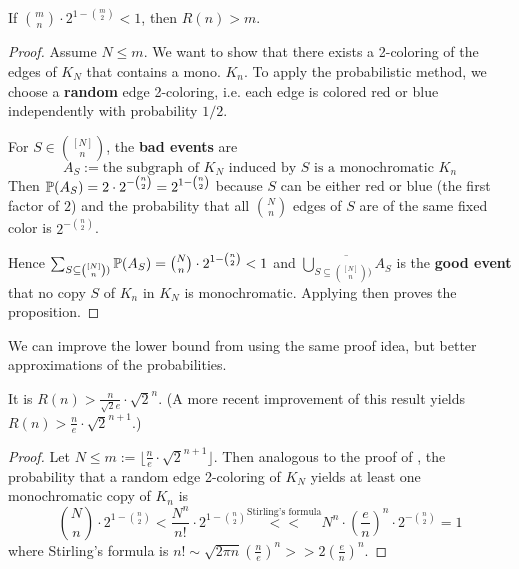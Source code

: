 \documentclass[../main.tex]{subfiles}
\begin{document}
\begin{proposition}[Erd\"os 1947]\label{prop:ramseyLowerProb}
	If $\binom{m}{n} \cdot 2^{1-\binom{m}{2}} < 1$, then $R(n) > m$.
\end{proposition}

\begin{proof}
Assume $N \leq m$. We want to show that there exists a 2-coloring of the edges of $K_N$ that contains a mono. $K_n$. To apply the probabilistic method, we choose a \textbf{random} edge 2-coloring, i.e. each edge is colored red or blue independently with probability $1/2$. 

For $S \in \binom{[N]}{n}$, the \textbf{bad events} are 
$$A_S := \text{the subgraph of } K_N \text{ induced by } S \text{ is a monochromatic } K_n$$
Then $\mathbb{P}(A_S) = 2 \cdot 2^{-\binom{n}{2}} = 2^{1-\binom{n}{2}}$ because $S$ can be either red or blue (the first factor of $2$) and the probability that all $\binom{N}{n}$ edges of $S$ are of the same fixed color is $2^{-\binom{n}{2}}$.

Hence $\sum_{S \subseteq \binom{[N]}{n})} \mathbb{P}(A_S) = \binom{N}{n} \cdot 2^{1-\binom{n}{2}} < 1$ and $\overline{\bigcup_{S \subseteq \binom{[N]}{n})} A_S}$ is the \textbf{good event} that no copy $S$ of $K_n$ in $K_N$ is monochromatic. Applying  then proves the proposition.
\end{proof}

We can improve the lower bound from  using the same proof idea, but better approximations of the probabilities.

\begin{corollary}\label{cor:ramseyBetterProb}
	It is $R(n) > \frac{n}{\sqrt{2}e} \cdot \sqrt{2}^n$.
	(A more recent improvement of this result yields $R(n) > \frac{n}{e} \cdot \sqrt{2}^{n+1}$.)
\end{corollary}

\begin{proof}
	Let $N \leq m := \lfloor \frac{n}{e} \cdot \sqrt{2}^{n+1} \rfloor$. Then analogous to the proof of , the probability that a random edge 2-coloring of $K_N$ yields at least one monochromatic copy of $K_n$ is 
	$$\binom{N}{n}\cdot 2^{1-\binom{n}{2}} < \frac{N^n}{n!} \cdot 2^{1-\binom{n}{2}} \overset{\text{Stirling's formula}}{<<} N^n \cdot (\frac{e}{n})^n \cdot 2^{-\binom{n}{2}} = 1$$
	where Stirling's formula is $n! \sim \sqrt{2\pi n} (\frac{n}{e})^n >> 2(\frac{e}{n})^n$.
\end{proof}
\end{document}
